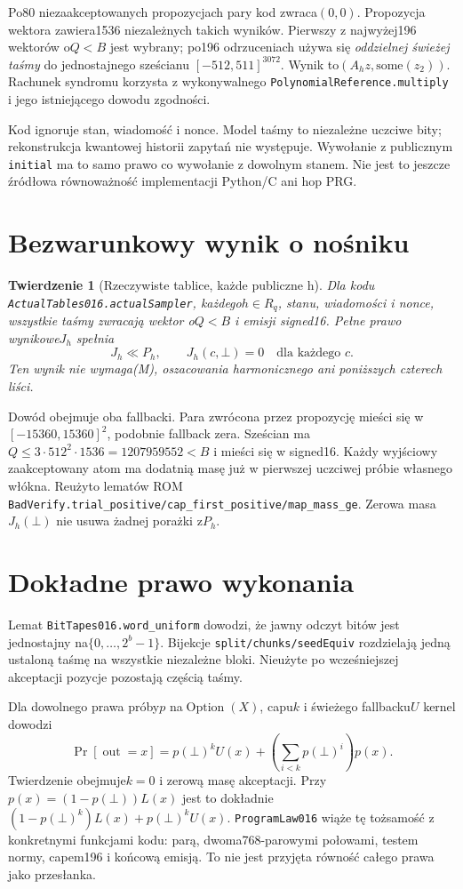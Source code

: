 \documentclass[11pt,a4paper]{article}
\newcommand{\code}[1]{\nolinkurl{#1}}
\newtheorem{theorem}{Twierdzenie}
\begin{document}
Po80 niezaakceptowanych propozycjach pary kod zwraca$(0,0)$.
Propozycja wektora zawiera1536 niezależnych takich wyników.
Pierwszy z najwyżej196 wektorów o$Q<B$ jest wybrany; po196 odrzuceniach
używa się \emph{oddzielnej świeżej taśmy} do jednostajnego sześcianu
$[-512,511]^{3072}$. Wynik to$(A_hz,\mathrm{some}(z_2))$.
Rachunek syndromu korzysta z wykonywalnego
\code{PolynomialReference.multiply} i jego istniejącego dowodu zgodności.

Kod ignoruje stan, wiadomość i nonce. Model taśmy to niezależne uczciwe bity;
rekonstrukcja kwantowej historii zapytań nie występuje. Wywołanie z publicznym
\code{initial} ma to samo prawo co wywołanie z dowolnym stanem.
Nie jest to jeszcze źródłowa równoważność implementacji Python/C ani hop PRG.

\section{Bezwarunkowy wynik o nośniku}
\begin{theorem}[Rzeczywiste tablice, każde publiczne h]
Dla kodu \code{ActualTables016.actualSampler}, każdego$h\in R_q$, stanu,
wiadomości i nonce, wszystkie taśmy zwracają wektor o$Q<B$ i emisji signed16.
Pełne prawo wynikowe$J_h$ spełnia
\[
 J_h\ll P_h,\qquad J_h(c,\bot)=0\quad\text{dla każdego }c.
\]
Ten wynik nie wymaga(M), oszacowania harmonicznego ani poniższych czterech liści.
\end{theorem}
Dowód obejmuje oba fallbacki. Para zwrócona przez propozycję mieści się
w$[-15360,15360]^2$, podobnie fallback zera. Sześcian ma
$Q\le3\cdot512^2\cdot1536=1207959552<B$ i mieści się w signed16.
Każdy wyjściowy zaakceptowany atom ma dodatnią masę już w pierwszej uczciwej
próbie własnego włókna. Reużyto lematów ROM
\code{BadVerify.trial_positive/cap_first_positive/map_mass_ge}.
Zerowa masa$J_h(\bot)$ nie usuwa żadnej porażki z$P_h$.

\section{Dokładne prawo wykonania}
Lemat \code{BitTapes016.word_uniform} dowodzi, że jawny odczyt bitów jest
jednostajny na$\{0,\ldots,2^b-1\}$. Bijekcje \code{split/chunks/seedEquiv}
rozdzielają jedną ustaloną taśmę na wszystkie niezależne bloki.
Nieużyte po wcześniejszej akceptacji pozycje pozostają częścią taśmy.

Dla dowolnego prawa próby$p$ na$\operatorname{Option}(X)$, capu$k$
i świeżego fallbacku$U$ kernel dowodzi
\[
 \Pr[\operatorname{out}=x]=p(\bot)^k U(x)+
 \left(\sum_{i<k}p(\bot)^i\right)p(x).
\]
Twierdzenie obejmuje$k=0$ i zerową masę akceptacji. Przy
$p(x)=(1-p(\bot))L(x)$ jest to dokładnie
$(1-p(\bot)^k)L(x)+p(\bot)^kU(x)$.
\code{ProgramLaw016} wiąże tę tożsamość z konkretnymi funkcjami kodu:
parą, dwoma768-parowymi połowami, testem normy, capem196 i końcową emisją.
To nie jest przyjęta równość całego prawa jako przesłanka.
\end{document}
